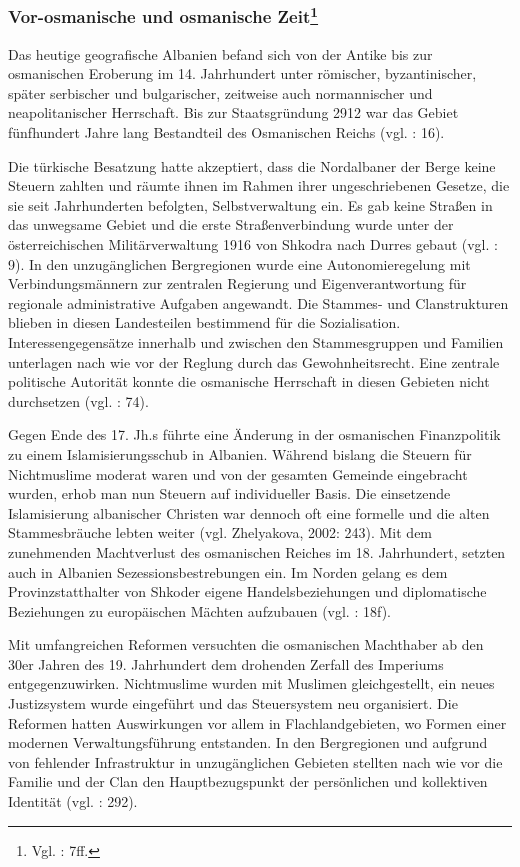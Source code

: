 \subsubsection[Vor-osmanische und osmanische Zeit]{Vor-osmanische und osmanische Zeit\footnote{Vgl. \cite{vollmer07} : 7ff.}}
Das heutige geografische Albanien befand sich von der Antike bis zur osmanischen Eroberung im 14. Jahrhundert unter römischer, byzantinischer, später serbischer und bulgarischer, zeitweise auch normannischer und neapolitanischer Herrschaft. Bis zur Staatsgründung 2912 war das Gebiet fünfhundert Jahre lang Bestandteil des Osmanischen Reichs (vgl. \cite{winnifrith} : 16).\par
Die türkische Besatzung hatte akzeptiert, dass die Nordalbaner der Berge keine Steuern zahlten und räumte ihnen im Rahmen ihrer ungeschriebenen Gesetze, die sie seit Jahrhunderten befolgten, Selbstverwaltung ein. Es gab keine Straßen in das unwegsame Gebiet und die erste Straßenverbindung wurde unter der österreichischen Militärverwaltung 1916 von Shkodra nach Durres gebaut (vgl. \cite{hasluk} : 9). In den unzugänglichen Bergregionen wurde eine Autonomieregelung mit Verbindungsmännern zur zentralen Regierung und Eigenverantwortung für regionale administrative Aufgaben angewandt. Die Stammes- und Clanstrukturen blieben in diesen Landesteilen bestimmend für die Sozialisation. Interessengegensätze innerhalb und zwischen den Stammesgruppen und Familien unterlagen nach wie vor der Reglung durch das Gewohnheitsrecht. Eine zentrale politische Autorität konnte die osmanische Herrschaft in diesen Gebieten nicht durchsetzen (vgl. \cite{hens99} : 74).\par
Gegen Ende des 17. Jh.s führte eine Änderung in der osmanischen Finanzpolitik zu einem Islamisierungsschub in Albanien. Während bislang die Steuern für Nichtmuslime moderat waren und von der gesamten Gemeinde eingebracht wurden, erhob man nun Steuern auf individueller Basis. Die einsetzende Islamisierung albanischer Christen war dennoch oft eine formelle und die alten Stammesbräuche lebten weiter (vgl. Zhelyakova, 2002: 243). Mit dem zunehmenden Machtverlust des osmanischen Reiches im 18. Jahrhundert, setzten auch in Albanien Sezessionsbestrebungen ein. Im Norden gelang es dem Provinzstatthalter von Shkoder eigene Handelsbeziehungen und diplomatische Beziehungen zu europäischen Mächten aufzubauen (vgl. \cite{vickers} : 18f).\par
Mit umfangreichen Reformen versuchten die osmanischen Machthaber ab den 30er Jahren des 19. Jahrhundert dem drohenden Zerfall des Imperiums entgegenzuwirken. Nichtmuslime wurden mit Muslimen gleichgestellt, ein neues Justizsystem wurde eingeführt und das Steuersystem neu organisiert. Die Reformen hatten Auswirkungen vor allem in Flachlandgebieten, wo Formen einer modernen Verwaltungsführung entstanden. In den Bergregionen und aufgrund von fehlender Infrastruktur in unzugänglichen Gebieten stellten nach wie vor die Familie und der Clan den Hauptbezugspunkt der persönlichen und kollektiven Identität (vgl. \cite{kaser} : 292).\par
